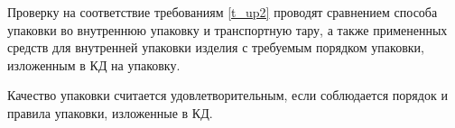 Проверку на соответствие требованиям \ref{t_up2} проводят сравнением способа упаковки во внутреннюю упаковку и транспортную тару, а также примененных средств для внутренней упаковки изделия с требуемым порядком упаковки, изложенным в КД на упаковку.

Качество упаковки считается удовлетворительным, если соблюдается порядок и правила упаковки, изложенные в КД.